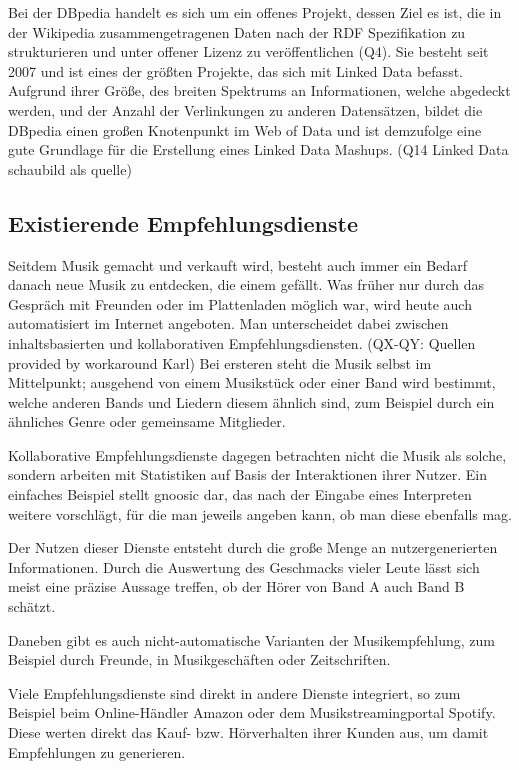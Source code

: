 Bei der DBpedia handelt es sich um ein offenes Projekt, dessen Ziel es ist, die in der Wikipedia zusammengetragenen Daten nach der RDF Spezifikation zu strukturieren und unter offener Lizenz zu veröffentlichen (Q4). Sie besteht seit 2007 und ist eines der größten Projekte, das sich mit Linked Data befasst. Aufgrund ihrer Größe, des breiten Spektrums an Informationen, welche abgedeckt werden, und der Anzahl der Verlinkungen zu anderen Datensätzen, bildet die DBpedia einen großen Knotenpunkt im Web of Data und ist demzufolge eine gute Grundlage für die Erstellung eines Linked Data Mashups.
(Q14 Linked Data schaubild als quelle)




\subsection{Existierende Empfehlungsdienste}
Seitdem Musik gemacht und verkauft wird, besteht auch immer ein Bedarf danach neue Musik zu entdecken, die einem gefällt. Was früher nur durch das Gespräch mit Freunden oder im Plattenladen möglich war, wird heute auch automatisiert im Internet angeboten.
Man unterscheidet dabei zwischen inhaltsbasierten und kollaborativen Empfehlungsdiensten. (QX-QY: Quellen provided by workaround Karl) Bei ersteren steht die Musik selbst im Mittelpunkt; ausgehend von einem Musikstück oder einer Band wird bestimmt, welche anderen Bands und Liedern diesem ähnlich sind, zum Beispiel durch ein ähnliches Genre oder gemeinsame Mitglieder.


Kollaborative Empfehlungsdienste dagegen betrachten nicht die Musik als solche, sondern arbeiten mit Statistiken auf Basis der Interaktionen ihrer Nutzer. Ein einfaches Beispiel stellt gnoosic dar, das nach der Eingabe eines Interpreten weitere vorschlägt, für die man jeweils angeben kann, ob man diese ebenfalls mag. 

Der Nutzen dieser Dienste entsteht durch die große Menge an nutzergenerierten Informationen. Durch die Auswertung des Geschmacks vieler Leute lässt sich meist eine präzise Aussage treffen, ob der Hörer von Band A auch Band B schätzt.

Daneben gibt es auch nicht-automatische Varianten der Musikempfehlung, zum Beispiel durch Freunde, in Musikgeschäften oder Zeitschriften.

Viele Empfehlungsdienste sind direkt in andere Dienste integriert, so zum Beispiel beim Online-Händler Amazon oder dem Musikstreamingportal Spotify. Diese werten direkt das Kauf- bzw. Hörverhalten ihrer Kunden aus, um damit Empfehlungen zu generieren.  

